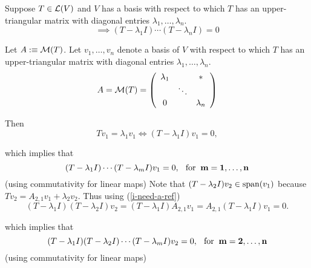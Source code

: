 \begin{thm}
  \label{thm:equation-satisfied-by-operator-with-upper-triangular-matrix}
  Suppose $T\in \mathcal{L}(V)$ and $V$ has a basis with respect to which $T$ has an upper-triangular matrix with diagonal entries $\lambda_1, \dots, \lambda_n$.
  \begin{equation}
    \implies (T-\lambda_1I) \cdots (T-\lambda_nI)=0
  \end{equation}
\end{thm}
\begin{prf}
  Let $A :\equiv \mathcal{M}(T)$. Let $v_1, \ldots, v_n$ denote a basis of $V$ with respect to which $T$  has an upper-triangular matrix with diagonal entries $\lambda_1, \ldots, \lambda_n$.
  \begin{equation}
    A=\mathcal{M}(T) =
    \left( {\begin{array}{ccc}
        \lambda_1 &         &  * \\
                  &  \ddots &    \\
            0     &         & \lambda_n
    \end{array} } \right)
  \end{equation}
  
  Then
  \begin{equation}
    \label{i-need-a-ref}
    T v_1 = \lambda_1 v_1 \iff (T-\lambda_1 I)  v_1 = 0,
  \end{equation}

  which implies that
  \begin{equation}
    (T-\lambda_1 I) \cdots (T-\lambda_m I) v_1 = 0, \;\;\, \text{for}\;\; \mathbf{m = 1, \ldots, n}
  \end{equation}
  (using commutativity for linear maps)
  \bigbreak
  Note that $(T-\lambda_2 I) v_2 \in \operatorname{span} (v_1)$ because $T v_2 = A_{2,1} v_1 + \lambda_2 v_2$. Thus using (\ref{i-need-a-ref})
  \begin{dmath}
    \label{i-also-need-a-ref}
    (T- \lambda_1 I) (T- \lambda_2 I) v_2 
    = (T- \lambda_1 I) A_{2,1}v_1  
    = A_{2,1}(T- \lambda_1 I) v_1
    =0.
  \end{dmath}
  
  which implies that
  \begin{equation}
    (T-\lambda_1 I) (T-\lambda_2 I) \cdots (T-\lambda_m I) v_2 = 0, \;\;\, \text{for}\;\; \mathbf{m = 2, \ldots, n}
  \end{equation}
  (using commutativity for linear maps)
  \bigbreak
  

\end{prf}
